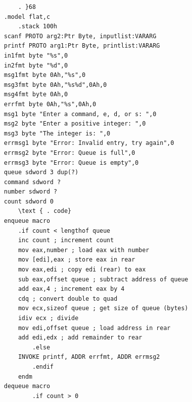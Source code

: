 \documentclass[10pt]{article}
\begin{document}
\begin{verbatim}
    . }68
.model flat,c
    .stack 100h
scanf PROTO arg2:Ptr Byte, inputlist:VARARG
printf PROTO arg1:Ptr Byte, printlist:VARARG
in1fmt byte "%s",0
in2fmt byte "%d",0
msg1fmt byte 0Ah,"%s",0
msg3fmt byte 0Ah,"%s%d",0Ah,0
msg4fmt byte 0Ah,0
errfmt byte 0Ah,"%s",0Ah,0
msg1 byte "Enter a command, e, d, or s: ",0
msg2 byte "Enter a positive integer: ",0
msg3 byte "The integer is: ",0
errmsg1 byte "Error: Invalid entry, try again",0
errmsg2 byte "Error: Queue is full",0
errmsg3 byte "Error: Queue is empty",0
queue sdword 3 dup(?)
command sdword ?
number sdword ?
count sdword 0
    \text { . code}
enqueue macro
    .if count < lengthof queue
    inc count ; increment count
    mov eax,number ; load eax with number
    mov [edi],eax ; store eax in rear
    mov eax,edi ; copy edi (rear) to eax
    sub eax,offset queue ; subtract address of queue
    add eax,4 ; increment eax by 4
    cdq ; convert double to quad
    mov ecx,sizeof queue ; get size of queue (bytes)
    idiv ecx ; divide
    mov edi,offset queue ; load address in rear
    add edi,edx ; add remainder to rear
        .else
    INVOKE printf, ADDR errfmt, ADDR errmsg2
        .endif
    endm
dequeue macro
        .if count > 0
\end{verbatim}
\end{document}
